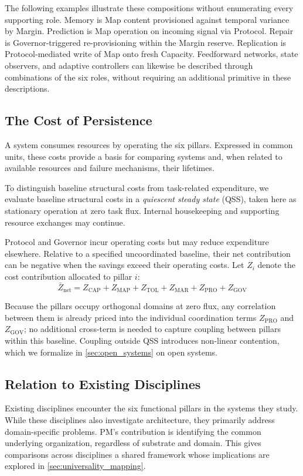 The following examples illustrate these compositions without enumerating every supporting role. Memory is Map content provisioned against temporal variance by Margin. Prediction is Map operation on incoming signal via Protocol. Repair is Governor-triggered re-provisioning within the Margin reserve. Replication is Protocol-mediated write of Map onto fresh Capacity. Feedforward networks, state observers, and adaptive controllers can likewise be described through combinations of the six roles, without requiring an additional primitive in these descriptions.


\subsection{The Cost of Persistence}
\label{subsec:cost_of_persistence}
A system consumes resources by operating the six pillars. Expressed in common units, these costs provide a basis for comparing systems and, when related to available resources and failure mechanisms, their lifetimes.

To distinguish baseline structural costs from task-related expenditure, we evaluate baseline structural costs in a \emph{quiescent steady state} (QSS), taken here as stationary operation at zero task flux. Internal housekeeping and supporting resource exchanges may continue.

Protocol and Governor incur operating costs but may reduce expenditure elsewhere. Relative to a specified uncoordinated baseline, their net contribution can be negative when the savings exceed their operating costs. Let $Z_i$ denote the cost contribution allocated to pillar $i$:
\begin{equation}
\label{eq:cost_of_persistence}
    \bar{Z}_{\mathrm{net}} = Z_{\mathrm{CAP}} + Z_{\mathrm{MAP}} + Z_{\mathrm{TOL}} + Z_{\mathrm{MAR}} + Z_{\mathrm{PRO}} + Z_{\mathrm{GOV}}
\end{equation}

Because the pillars occupy orthogonal domains at zero flux, any correlation between them is already priced into the individual coordination terms $Z_{\mathrm{PRO}}$ and $Z_{\mathrm{GOV}}$; no additional cross-term is needed to capture coupling between pillars within this baseline. Coupling outside QSS introduces non-linear contention, which we formalize in \cref{sec:open_systems} on open systems.


\subsection{Relation to Existing Disciplines}
\label{subsec:relations}
Existing disciplines encounter the six functional pillars in the systems they study. While these disciplines also investigate architecture, they primarily address domain-specific problems. PM's contribution is identifying the common underlying organization, regardless of substrate and domain. This gives comparisons across disciplines a shared framework whose implications are explored in \cref{sec:universality_mapping}.

